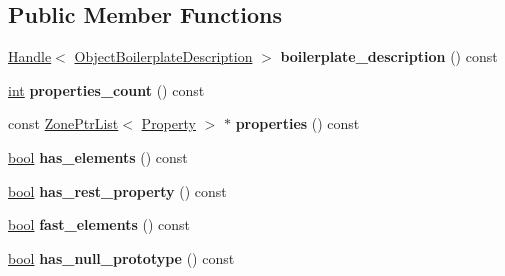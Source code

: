 \subsection*{Public Member Functions}
\begin{DoxyCompactItemize}
\item 
\mbox{\label{classv8_1_1internal_1_1ObjectLiteral_ac29475e44081a30fdb55d694b6a100f9}} 
\mbox{\hyperlink{classv8_1_1internal_1_1Handle}{Handle}}$<$ \mbox{\hyperlink{classv8_1_1internal_1_1ObjectBoilerplateDescription}{Object\+Boilerplate\+Description}} $>$ {\bfseries boilerplate\+\_\+description} () const
\item 
\mbox{\label{classv8_1_1internal_1_1ObjectLiteral_a490b39124a3df09cb699e7a2acdf303d}} 
\mbox{\hyperlink{classint}{int}} {\bfseries properties\+\_\+count} () const
\item 
\mbox{\label{classv8_1_1internal_1_1ObjectLiteral_a89e07ef5999aab0dd41ea7600da6f51d}} 
const \mbox{\hyperlink{classv8_1_1internal_1_1ZoneList}{Zone\+Ptr\+List}}$<$ \mbox{\hyperlink{classv8_1_1internal_1_1ObjectLiteralProperty}{Property}} $>$ $\ast$ {\bfseries properties} () const
\item 
\mbox{\label{classv8_1_1internal_1_1ObjectLiteral_a676dee622bd63d9917acac67f7bd797a}} 
\mbox{\hyperlink{classbool}{bool}} {\bfseries has\+\_\+elements} () const
\item 
\mbox{\label{classv8_1_1internal_1_1ObjectLiteral_a1b2a3e3049352c7321dfdd33f806e03b}} 
\mbox{\hyperlink{classbool}{bool}} {\bfseries has\+\_\+rest\+\_\+property} () const
\item 
\mbox{\label{classv8_1_1internal_1_1ObjectLiteral_a487c79d72d1aed1aa449bbb35a513312}} 
\mbox{\hyperlink{classbool}{bool}} {\bfseries fast\+\_\+elements} () const
\item 
\mbox{\label{classv8_1_1internal_1_1ObjectLiteral_a476706d4a36b527e0256ff76c290d48e}} 
\mbox{\hyperlink{classbool}{bool}} {\bfseries has\+\_\+null\+\_\+prototype} () const
\item 

\end{DoxyCompactItemize}

